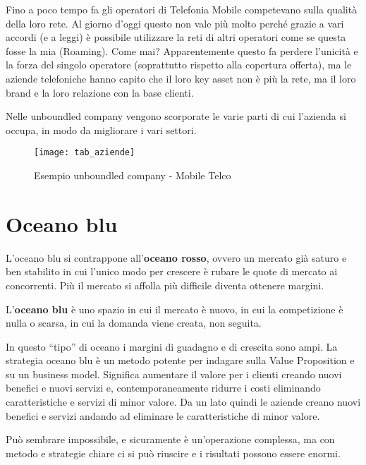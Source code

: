 Fino a poco tempo fa gli operatori di Telefonia Mobile competevano sulla
qualità della loro rete. Al giorno d'oggi questo non vale più molto perché
grazie a vari accordi (e a leggi) è possibile utilizzare la reti di altri
operatori come se questa fosse la mia (Roaming). Come mai? Apparentemente
questo fa perdere l'unicità e la forza del singolo operatore (soprattutto
rispetto alla copertura offerta), ma le aziende telefoniche hanno capito che il
loro key asset non è più la rete, ma il loro brand e la loro relazione con la
base clienti.

Nelle unboundled company vengono scorporate le varie parti di cui l'azienda si
occupa, in modo da migliorare i vari settori.

\begin{figure}[t]
 \centering
 \texttt{[image: tab\_aziende]}
 \caption{Esempio unboundled company - Mobile Telco}
 \label{fig:bmi:unboldedcompanytelco}
\end{figure}


\section{Oceano blu}

L'oceano blu si contrappone all'\textbf{oceano rosso}, ovvero un mercato già
saturo e ben stabilito in cui l'unico modo per crescere è rubare le quote di
mercato ai concorrenti. Più il mercato si affolla più difficile diventa
ottenere margini.

\begin{definition}
L'\textbf{oceano blu} è uno spazio in cui il mercato è nuovo, in cui la
competizione è nulla o scarsa, in cui la domanda viene creata, non seguita.
\end{definition}

\noindent In questo ``tipo'' di oceano i margini di guadagno e di crescita sono
ampi. La strategia oceano blu è un metodo potente per indagare sulla Value
Proposition e su un business model. Significa aumentare il valore per i clienti
creando nuovi benefici e nuovi servizi e, contemporaneamente ridurre i costi
eliminando caratteristiche e servizi di minor valore.
Da un lato quindi le aziende creano nuovi benefici e servizi andando ad
eliminare le caratteristiche di minor valore.

Può sembrare impossibile, e sicuramente è un'operazione complessa, ma con
metodo e strategie chiare ci si può riuscire e i risultati possono essere
enormi.

